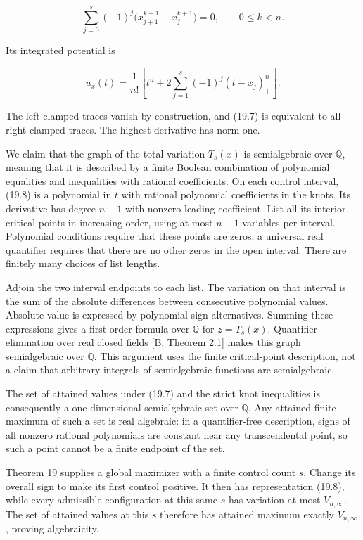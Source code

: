 \documentclass[11pt]{article}
\begin{document}
\[
\sum_{j=0}^s(-1)^j
\bigl(x_{j+1}^{k+1}-x_j^{k+1}\bigr)=0,
\qquad 0\le k<n.
\tag{19.7}
\]

Its integrated potential is

\[
u_x(t)=\frac1{n!}\left[t^n+
2\sum_{j=1}^s(-1)^j(t-x_j)_+^n\right].
\tag{19.8}
\]

The left clamped traces vanish by construction, and (19.7) is equivalent
to all right clamped traces. The highest derivative has norm one.

We claim that the graph of the total variation \(T_s(x)\) is
semialgebraic over \(\mathbb Q\), meaning that it is described by a
finite Boolean combination of polynomial equalities and inequalities
with rational coefficients. On each control interval, (19.8) is a
polynomial in \(t\) with rational polynomial coefficients in the knots.
Its derivative has degree \(n-1\) with nonzero leading coefficient. List
all its interior critical points in increasing order, using at most
\(n-1\) variables per interval. Polynomial conditions require that these
points are zeros; a universal real quantifier requires that there are no
other zeros in the open interval. There are finitely many choices of
list lengths.

Adjoin the two interval endpoints to each list. The variation on that
interval is the sum of the absolute differences between consecutive
polynomial values. Absolute value is expressed by polynomial sign
alternatives. Summing these expressions gives a first-order formula over
\(\mathbb Q\) for \(z=T_s(x)\). Quantifier elimination over real closed
fields {[}B, Theorem 2.1{]} makes this graph semialgebraic over
\(\mathbb Q\). This argument uses the finite critical-point description,
not a claim that arbitrary integrals of semialgebraic functions are
semialgebraic.

The set of attained values under (19.7) and the strict knot inequalities
is consequently a one-dimensional semialgebraic set over \(\mathbb Q\).
Any attained finite maximum of such a set is real algebraic: in a
quantifier-free description, signs of all nonzero rational polynomials
are constant near any transcendental point, so such a point cannot be a
finite endpoint of the set.

Theorem 19 supplies a global maximizer with a finite control count
\(s\). Change its overall sign to make its first control positive. It
then has representation (19.8), while every admissible configuration at
this same \(s\) has variation at most \(V_{n,\infty}\). The set of
attained values at this \(s\) therefore has attained maximum exactly
\(V_{n,\infty}\), proving algebraicity.
\end{document}
